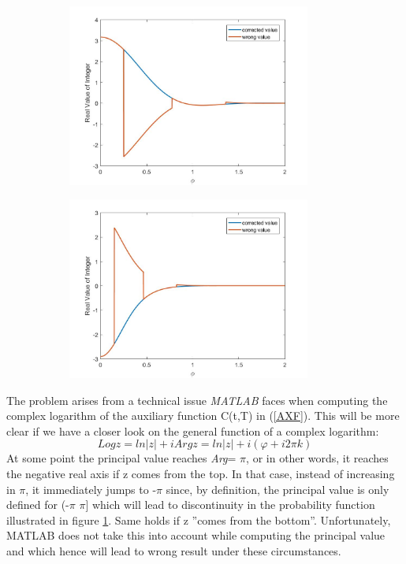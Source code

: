 \documentclass[a4paper,11pt]{article}
\begin{document}
\begin{figure}[!h]
\caption{Probability function $F_1$ and $F_2$ in the SZ model}
\begin{subfigure}[c]{0.5\textwidth}
\includegraphics[width=8cm]{plot31.jpeg}
\end{subfigure}
\begin{subfigure}[c]{0.5\textwidth}
\includegraphics[width=8cm]{plot32.jpeg}
\end{subfigure}
\label{pl3}
\end{figure}
The problem arises from a technical issue \textit{MATLAB} faces when computing the complex logarithm of the auxiliary function C(t,T) in (\ref{AXF}).
This will be more clear if we have a closer look on the general function of a complex logarithm:
\begin{equation*}
Log z = ln|z| + i Arg z =   ln|z| + i (\varphi + i 2\pi k)
\end{equation*}
At some point the principal value reaches \textit{Arg}= $\pi$, or in other words, it reaches the negative real axis if z comes from the top. In that case, instead of increasing in $\pi$, it immediately jumps to -$\pi$ since, by definition, the principal value is only defined for (-$\pi$ $\pi$] which will lead to discontinuity in the probability function illustrated in figure \ref{pl3}. Same holds if z ''comes from the bottom''. Unfortunately, MATLAB does not take this into account while computing the principal value and which hence will lead to wrong result under these circumstances. 
\end{document}

